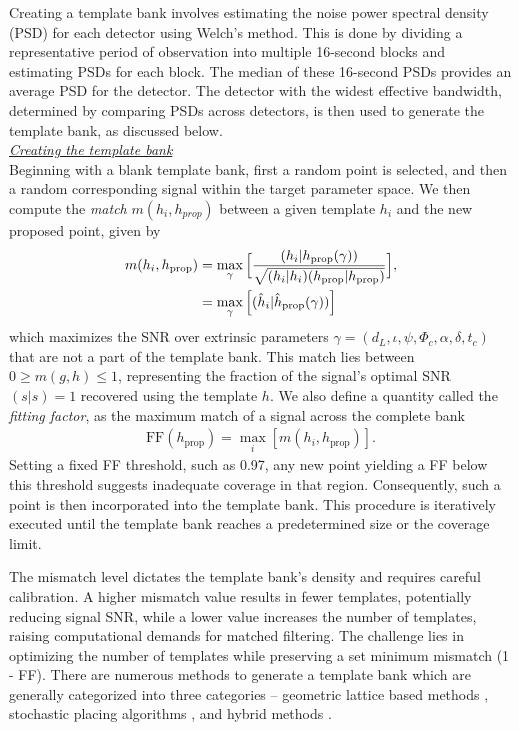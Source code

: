 Creating a template bank involves estimating the noise power spectral density (PSD) for each detector using Welch's method. This is done by dividing a representative period of observation into multiple 16-second blocks and estimating PSDs for each block. The median of these 16-second PSDs provides an average PSD for the detector. The detector with the widest effective bandwidth, determined by comparing PSDs across detectors, is then used to generate the template bank, as discussed below.\\  

\noindent\underline{\textit{Creating the template bank}}\\
Beginning with a blank template bank, first a random point is selected, and then a random corresponding signal within the target parameter space. We then compute the \textit{match} $m(h_i, h_{prop})$ between a given template $h_i$ and the new proposed point, given by
\begin{align}
    m(h_i, h_{\text{prop}}) &= \max_{\gamma} \Big[ \dfrac{(h_i|h_{\text{prop}}(\gamma))}{\sqrt{(h_i|h_i)(h_{\text{prop}}|h_{\text{prop}})}} \Big], \notag \\
            &= \max_{\gamma} \Big[ (\hat{h}_i|\hat{h}_{\text{prop}}(\gamma))\Big]
    \label{Eq:match-definition}
\end{align}
which maximizes the SNR over extrinsic parameters $\gamma = (d_L, \iota, \psi, \Phi_c, \alpha, \delta, t_c)$ that are not a part of the template bank. This match lies between  $0 \geq m(g,h) \leq 1$, representing the fraction of the signal's optimal SNR $(s|s) = 1$ recovered using the template $h$. We also define a quantity called the \textit{fitting factor}, as the maximum match of a signal across the complete bank 
\begin{align}
    \text{FF}(h_{\text{prop}}) = \max_i [m(h_i,h_{\text{prop}})].
    \label{Eq:fitting-factor}
\end{align}
Setting a fixed FF threshold, such as 0.97, any new point yielding a FF below this threshold suggests inadequate coverage in that region. Consequently, such a point is then incorporated into the template bank. This procedure is iteratively executed until the template bank reaches a predetermined size or the coverage limit.

The mismatch level dictates the template bank's density and requires careful calibration. A higher mismatch value results in fewer templates, potentially reducing signal SNR, while a lower value increases the number of templates, raising computational demands for matched filtering. The challenge lies in optimizing the number of templates while preserving a set minimum mismatch (1 - FF). There are numerous methods to generate a template bank which are generally categorized into three categories -- geometric lattice based methods \cite{Owen:1998dk, Babak:2006ty}, stochastic placing algorithms \cite{Harry:2009ea, Babak:2008rb}, and hybrid methods \cite{Roy:2017oul, Capano:2016dsf}. 
  

